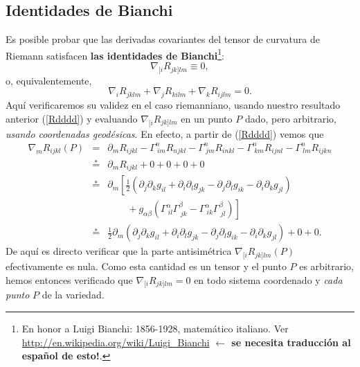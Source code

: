 \subsection{Identidades de Bianchi}
Es posible probar que las derivadas covariantes del tensor de curvatura de Riemann
satisfacen \textbf{las identidades de Bianchi}\footnote{En honor a Luigi Bianchi: 1856-1928, matemático italiano. Ver \url{http://en.wikipedia.org/wiki/Luigi_Bianchi}  \textbf{$\leftarrow$ se necesita traducción al español de esto!}.}:
\begin{equation}
\boxed{\nabla_{\lbrack i}R_{jk]l m}\equiv 0,}
\end{equation}
o, equivalentemente,
\begin{equation}
 \nabla_iR_{jklm}+\nabla_jR_{kilm}+\nabla_kR_{ijlm}=0. \label{Bi2}
\end{equation}
Aquí verificaremos su validez en el caso riemanniano, usando nuestro resultado anterior (\ref{Rdddd}) y evaluando $\nabla_{\lbrack i}R_{jk]l m}$ en un punto $P$ dado, pero arbitrario, \textit{usando coordenadas geodésicas}. En efecto, a partir de (\ref{Rdddd}) vemos que
\begin{eqnarray}
 \nabla_mR_{ijkl}(P)&=&\partial_mR_{ijkl}-\Gamma^n_{\ im} R_{njkl}-\Gamma^n_{\ jm} R_{inkl}-\Gamma^n_{\ km} R_{ijnl}-\Gamma^n_{\ lm} R_{ijkn}\\
&\stackrel{*}{=}&\partial_mR_{ijkl}+0+0+0+0\\
&\stackrel{*}{=}&\partial_m\left[\frac{1}{2}\left(\partial_j\partial_kg_{il}+\partial_i\partial_lg_{jk}-\partial_j\partial_lg_{ik}-\partial_i\partial_kg_{jl}\right) \right. \nonumber\\
& &  \qquad + \left. g_{\alpha\beta}\left(\Gamma^\alpha_{\ il}\Gamma^\beta_{\ jk}-\Gamma^\alpha_{\ ik}\Gamma^\beta_{\ jl}\right)\right]\\
&\stackrel{*}{=}&\frac{1}{2}\partial_m\left(\partial_j\partial_kg_{il}+\partial_i\partial_lg_{jk}-\partial_j\partial_lg_{ik}-\partial_i\partial_kg_{jl}\right) + 0 +0.
\end{eqnarray}
De aquí es directo verificar que la parte antisimétrica $\nabla_{\lbrack i}R_{jk]l m}(P)$ efectivamente es nula. Como esta cantidad es un tensor y el punto $P$ es arbitrario, hemos entonces verificado que $\nabla_{\lbrack i}R_{jk]l m}=0$ en todo sistema coordenado y \textit{cada punto} $P$ de la variedad.

